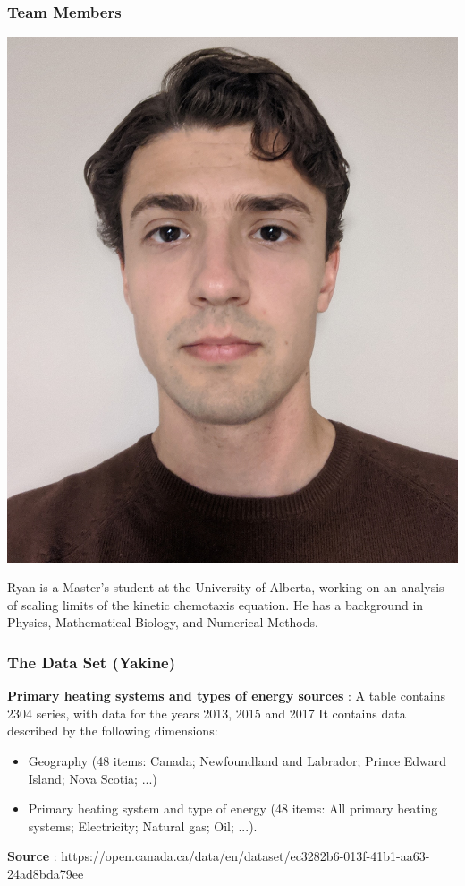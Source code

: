 \documentclass{beamer}
\begin{document}
\begin{frame}
\frametitle{Team Members}

\vspace{10pt}
\begin{minipage}[b]{0.15\textwidth}
\includegraphics[width=\textwidth, trim={70pt 170pt 70pt 100pt}, clip]{TeamPics/ryan.jpg}
\end{minipage}\hspace{0.05\textwidth}%
\begin{minipage}[b]{0.8\textwidth}
{\small Ryan is a Master’s student at the University of Alberta, working on an analysis of scaling limits of the kinetic chemotaxis equation. He has a background in Physics, Mathematical Biology, and Numerical Methods.}
\end{minipage}


\end{frame}





\begin{frame}
\frametitle{The Data Set (Yakine)}
\textbf{Primary heating systems and types of energy sources} : A table contains 2304 series, with data for the years 2013, 2015 and 2017
It contains data described by the following dimensions:
\begin{itemize}
\item Geography (48 items: Canada; Newfoundland and Labrador; Prince Edward Island; Nova Scotia; ...)
\item Primary heating system and type of energy (48 items: All primary heating systems; Electricity; Natural gas; Oil; ...).
\end{itemize}
\textbf{Source} : https://open.canada.ca/data/en/dataset/ec3282b6-013f-41b1-aa63-24ad8bda79ee
\end{frame}
\end{document}
